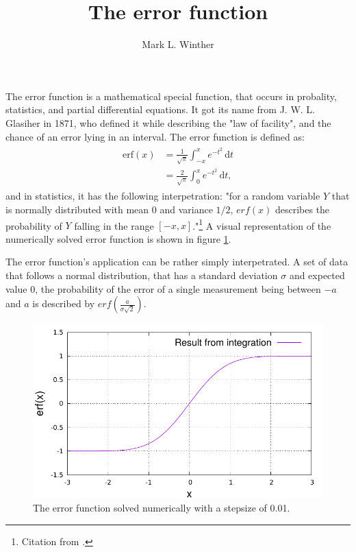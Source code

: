 \documentclass[twocolumn]{article}
\author{Mark L. Winther}
\title{The error function}
\newcommand\erf{\ensuremath{\mathrm{erf}}\xspace}
\newcommand\dx[1]{\,\text{d}#1}
\begin{document}
\maketitle
The error function is a mathematical special function, that occurs in probality, statistics, and partial differential equations. It got its name from J. W. L. Glasiher in 1871, who defined it while describing the "law of facility", and the chance of an error lying in an interval. The error function is defined as:
\begin{align}
\begin{split}
	\erf(x)	&= \frac{1}{\sqrt{\pi}} \int_{-x}^{x} e^{-t^2} \dx{t}\\
			&= \frac{2}{\sqrt{\pi}} \int_{0}^{x} e^{-t^2} \dx{t},
\label{eq:ferr}
\end{split}
\end{align}
and in statistics, it has the following interpetration: "for a random variable $Y$ that is normally distributed with mean 0 and variance $1/2$, $erf(x)$ describes the probability of $Y$ falling in the range $[-x,x]$."\footnote{Citation from \cite{wiki}.} A visual representation of the numerically solved error function is shown in figure \ref{fig:ferr}.

The error function's application can be rather simply interpetrated. A set of data that follows a normal distribution, that has a standard deviation $\sigma$ and expected value $0$, the probability of the error of a single measurement being between $-a$ and $a$ is described by $erf\left(\frac{a}{\sigma\sqrt{2}}\right)$.

\begin{figure}[ht]
	\centering
	\includegraphics[width=\linewidth]{ferr.pdf}
	\caption{The error function solved numerically with a stepsize of 0.01.}
	\label{fig:ferr}
\end{figure}
\end{document}

